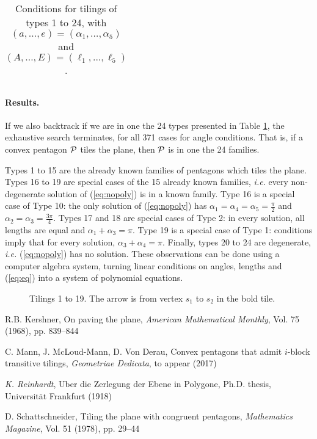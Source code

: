 \documentclass[11pt]{article}
\theoremstyle{definition}
\begin{document}
\begin{table}
%
\scriptsize
  \begin{tabularx}{\textwidth}{|p{1.1cm}|X|p{2.2cm}||p{1.1cm}|X|p{2.2cm}|}
\hline

\end{tabularx}
%
  \caption{Conditions for tilings of types 1 to 24, with $(a,\ldots, e)=(\alpha_1,\ldots, \alpha_5)$ and $(A,\ldots, E)=(\ell_1,\ldots, \ell_5)$.}\label{table:types}
\end{table}


\paragraph{Results.}
%
%
%
%
%
If we also backtrack if we are in one the 24 types presented in Table \ref{table:types}, the exhaustive search terminates, for all 371 cases for angle conditions.
That is, if a convex pentagon $\penta$ tiles the plane, then $\penta$ is in one the 24 families.

Types 1 to 15 are the already known families of pentagons which tiles the plane. 
Types 16 to 19 are special cases of the 15 already known families, \emph{i.e.} every non-degenerate solution of (\ref{eq:nopoly}) is in a known family. 
Type 16 is a special case of Type 10: the only solution of (\ref{eq:nopoly}) has $\alpha_1=\alpha_4=\alpha_5=\frac{\pi}{2}$ and $\alpha_2=\alpha_3=\frac{3\pi}{4}$.
Types 17 and 18 are special cases of Type 2: in every solution, all lengths are equal and $\alpha_1+\alpha_3=\pi$.
Type 19 is a special case of Type 1: conditions imply that for every solution, $\alpha_3+\alpha_4=\pi$.
Finally, types 20 to 24 are degenerate, \emph{i.e.} (\ref{eq:nopoly}) has no solution. These observations can be done using a computer algebra system, turning linear conditions on angles, lengths and (\ref{eq:eq}) into a system of polynomial equations.

%


%
%
%
%
%
%


%
%
%

\begin{figure}
\begin{tikzpicture}[scale=.7]

\end{tikzpicture}
\caption{Tilings 1 to 19. The arrow is from vertex $s_1$ to $s_2$ in the bold tile.}
\end{figure}

\begin{thebibliography}{9}
  {\sc R.B. Kershner},
  On paving the plane,
  {\sl American Mathematical Monthly}, Vol. 75 (1968), pp. 839--844

  {\sc   C.  Mann,  J.  McLoud-Mann,  D.  Von  Derau},
  Convex  pentagons  that  admit  $i$-block  transitive tilings,
%
{\sl Geometriae Dedicata}, to appear (2017)

 {\sl K. Reinhardt},
  Uber die Zerlegung der Ebene in Polygone,
  Ph.D. thesis, Universit\"at Frankfurt (1918)

{\sc   D. Schattschneider},
Tiling the plane with congruent pentagons,
{\sl Mathematics Magazine}, Vol. 51 (1978), pp. 29--44


\end{thebibliography}
\end{document}
